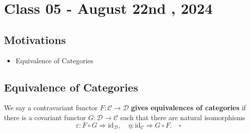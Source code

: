 \documentclass[../category_theory.tex]{subfiles}
\begin{document}
\section{Class 05 - August 22nd , 2024}
\subsection{Motivations}
\begin{itemize}
	\item Equivalence of Categories
\end{itemize}
\subsection{Equivalence of Categories}
\begin{def*}
	We say a contravariant functor \(F:\mathcal{C}\rightarrow \mathcal{D}\) \textbf{gives equivalences of categories} if there is a covariant functor \(G:\mathcal{D}\rightarrow \mathcal{C}\) such that there are natural isomorphisms
	\[
		\varepsilon :F\circ G\Rightarrow \mathrm{id}_{\mathcal{D}},\quad \eta :\mathrm{id}_{\mathcal{C}}\Rightarrow G\circ F.\quad \square
	\]
\end{def*}
\end{document}
